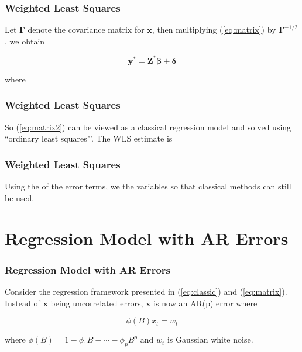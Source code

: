 \documentclass[%
xcolor=pdftex]{beamer}
\begin{document}
\begin{frame}
\frametitle{Weighted Least Squares}

Let $\boldsymbol{\Gamma}$ denote the covariance matrix for $\boldsymbol{x}$, then multiplying (\ref{eq:matrix}) by $\boldsymbol{\Gamma}^{-1/2}$, we obtain\\

\vspace{15mm}

\begin{equation} \label{eq:matrix2}
\boldsymbol{y^*} = \boldsymbol{Z^* \beta} + \boldsymbol{\delta}
\end{equation}

where

\vspace{30mm}

\end{frame}

\begin{frame}
\frametitle{Weighted Least Squares}

So (\ref{eq:matrix2}) can be viewed as a classical regression model and solved using ``ordinary least squares"'. The WLS estimate is

\vspace{50mm}

\end{frame}

\begin{frame}
\frametitle{Weighted Least Squares}

Using the \underline{\hspace{35 mm}} of the error terms, we \underline{\hspace{15 mm}} the variables so that classical methods can still be used. 

\end{frame}

\section{Regression Model with AR Errors}
\frame{\tableofcontents[currentsection]}

\begin{frame}
\frametitle{Regression Model with AR Errors}

Consider the regression framework presented in (\ref{eq:classic}) and (\ref{eq:matrix}). Instead of $\boldsymbol{x}$ being uncorrelated errors, $\boldsymbol{x}$ is now an AR(p) error where

\begin{equation*}
\phi(B)x_t = w_t
\end{equation*}

where $\phi(B) = 1- \phi_1 B - \cdots - \phi_p B^p$ and $w_t$ is Gaussian white noise.

\end{frame}
\end{document}
